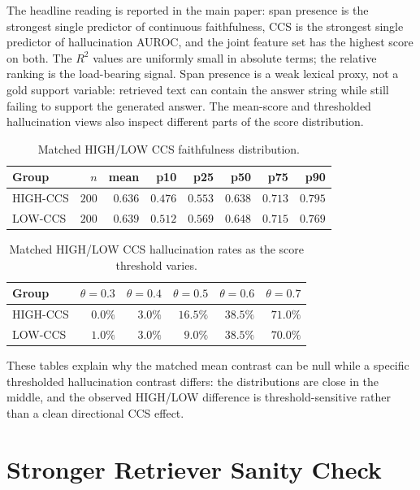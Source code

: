 The headline reading is reported in the main paper: span presence is
the strongest single predictor of continuous faithfulness, CCS is the
strongest single predictor of hallucination AUROC, and the joint
feature set has the highest score on both. The $R^2$ values are uniformly small in
absolute terms; the relative ranking is the load-bearing signal.
Span presence is a weak lexical proxy, not a gold support variable:
retrieved text can contain the answer string while still failing to
support the generated answer. The mean-score and thresholded
hallucination views also inspect different parts of the score
distribution.

\begin{table}[!htb]
\centering
\caption{Matched HIGH/LOW CCS faithfulness distribution.}
\footnotesize
\begin{tabular}{lrrrrrrr}
\toprule
Group & $n$ & mean & p10 & p25 & p50 & p75 & p90 \\
\midrule
HIGH-CCS & $200$ & $0.636$ & $0.476$ & $0.553$ & $0.638$ & $0.713$ & $0.795$ \\
LOW-CCS  & $200$ & $0.639$ & $0.512$ & $0.569$ & $0.648$ & $0.715$ & $0.769$ \\
\bottomrule
\end{tabular}
\end{table}

\begin{table}[!htb]
\centering
\caption{Matched HIGH/LOW CCS hallucination rates as the score
threshold varies.}
\footnotesize
\begin{tabular}{lrrrrr}
\toprule
Group & $\theta=0.3$ & $\theta=0.4$ & $\theta=0.5$ & $\theta=0.6$ & $\theta=0.7$ \\
\midrule
HIGH-CCS & $0.0\%$ & $3.0\%$ & $16.5\%$ & $38.5\%$ & $71.0\%$ \\
LOW-CCS  & $1.0\%$ & $3.0\%$ & $\phantom{1}9.0\%$ & $38.5\%$ & $70.0\%$ \\
\bottomrule
\end{tabular}
\end{table}

These tables explain why the matched mean contrast can be null while a
specific thresholded hallucination contrast differs: the distributions
are close in the middle, and the observed HIGH/LOW difference is
threshold-sensitive rather than a clean directional CCS effect.

\section{Stronger Retriever Sanity Check}
\label{app:retriever_sanity}

